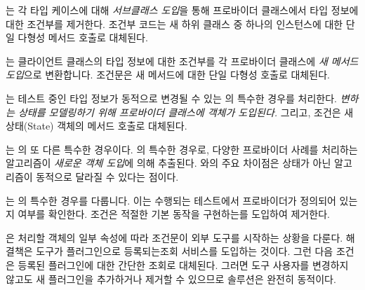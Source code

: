 \documentclass[a4paper,10pt,twoside]{book}
\begin{document}
\begin{bulletlist}
\item {}는 각 타입 케이스에 대해 \emph{서브클래스 도입}을 통해 프로바이더 클래스에서 타입 정보에 대한 조건부를 제거한다. 조건부 코드는 새 하위 클래스 중 하나의 인스턴스에 대한 단일 다형성 메서드 호출로 대체된다.

\item {}는 클라이언트 클래스의 타입 정보에 대한 조건부를 각 프로바이더 클래스에 \emph{새 메서드 도입}으로 변환합니다. 조건문은 새 메서드에 대한 단일 다형성 호출로 대체된다.

\item {}는 테스트 중인 타입 정보가 동적으로 변경될 수 있는 의 특수한 경우를 처리한다. \emph{변하는 상태를 모델링하기 위해 프로바이더 클래스에  객체가 도입된다.} 그리고, 조건은 새 상태(State) 객체의 메서드 호출로 대체된다.

\item {}는 의 또 다른 특수한 경우이다. 의 특수한 경우로, 다양한 프로바이더 사례를 처리하는 알고리즘이 \emph{새로운  객체 도입}에 의해 추출된다. 와의 주요 차이점은 상태가 아닌 알고리즘이 동적으로 달라질 수 있다는 점이다.

\item {}는 의 특수한 경우를 다룹니다. 이는 수행되는 테스트에서 프로바이더가 정의되어 있는지 여부를 확인한다. 조건은 적절한 기본 동작을 구현하는\emph{}를 도입하여 제거한다.

\item {}은 처리할 객체의 일부 속성에 따라 조건문이 외부 도구를 시작하는 상황을 다룬다. 해결책은 도구가 플러그인으로 등록되는조회 서비스를 도입하는 것이다. 그런 다음 조건은 등록된 플러그인에 대한 간단한 조회로 대체된다. 그러면 도구 사용자를 변경하지 않고도 새 플러그인을 추가하거나 제거할 수 있으므로 솔루션은 완전히 동적이다. 
\end{bulletlist}

\end{document}
